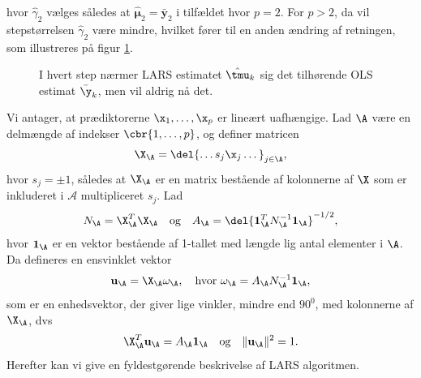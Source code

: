 hvor $\widehat{\gamma}_2$ vælges således at $\widehat{\boldsymbol{\mu}}_2 = \bar{\textbf{y}}_2$ i tilfældet hvor $p = 2$. 
For \(p>2\), da vil stepstørrelsen \(\widehat{\gamma}_2\) være mindre, hvilket fører til en anden ændring af retningen, som illustreres på figur \ref{fig:lars2}.
%
\begin{figure}[H]
\centering
\scalebox{0.8}{}
\caption{I hvert step nærmer LARS estimatet \(\hat{\tmu}_k\) sig det tilhørende OLS estimat \(\bar{\y}_k\), men vil aldrig nå det.
 }\label{fig:lars2}
\end{figure}
%
Vi antager, at prædiktorerne \(\x_1, \ldots, \x_p\) er lineært uafhængige.
Lad \(\A\) være en delmængde af indekser \(\cbr{1,\ldots, p}\), og definer matricen
\begin{align}
\X_\A = \del{\dots s_j \x_j \dots}_{j \in \A}, \label{eq:lars_2.4}
\end{align}
hvor  $s_j = \pm 1$, således at \(\X_\A\) er en matrix bestående af kolonnerne af \(\X\) som er inkluderet i \(\mathcal{A}\) multipliceret \(s_j\).
Lad 
\begin{align}
N_\A = \X_\A^T \X_\A \quad \text{og} \quad A_\A = \del{\mathbf{1}_\A^T N_\A^{-1} \mathbf{1}_\A}^{-1/2}, \label{eq:lars_2.5}
\end{align}
hvor \(\mathbf{1}_\A\) er en vektor bestående af 1-tallet med længde lig antal elementer i \(\A\).
Da defineres en ensvinklet vektor
\begin{align}
\mathbf{u}_\A = \X_\A \omega_\A, \quad \text{hvor } \omega_\A = A_\A N_\A^{-1} \mathbf{1}_\A, \label{eq:lars_2.6}
\end{align}
som er en enhedsvektor, der giver lige vinkler, mindre end \(90^0\), med kolonnerne af \(\X_\A\), dvs
\begin{align}
\X_\A^T \mathbf{u}_\A = A_\A \mathbf{1}_\A \quad \text{og} \quad \Vert \mathbf{u}_\A \Vert^2 = 1. \label{eq:lars_2.7}
\end{align}
Herefter kan vi give en fyldestgørende beskrivelse af LARS algoritmen.
%

